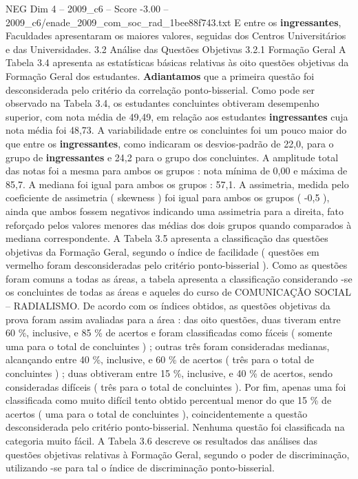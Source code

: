 \begin{textsample}{NEG Dim 4 – 2009\_c6 – Score -3.00 – 2009\_c6/enade\_2009\_com\_soc\_rad\_1bee88f743.txt}
E entre os \textbf{ingressantes}, Faculdades apresentaram os maiores valores, seguidas dos Centros Universitários e das Universidades. 3.2 Análise das Questões Objetivas 3.2.1 Formação Geral A Tabela 3.4 apresenta as estatísticas básicas relativas às oito questões objetivas da Formação Geral dos estudantes. \textbf{Adiantamos} que a primeira questão foi desconsiderada pelo critério da correlação ponto-bisserial.
Como pode ser observado na Tabela 3.4, os estudantes concluintes obtiveram desempenho superior, com nota média de 49,49, em relação aos estudantes \textbf{ingressantes} cuja nota média foi 48,73.
A variabilidade entre os concluintes foi um pouco maior do que entre os \textbf{ingressantes}, como indicaram os desvios-padrão de 22,0, para o grupo de \textbf{ingressantes} e 24,2 para o grupo dos concluintes.
A amplitude total das notas foi a mesma para ambos os grupos : nota mínima de 0,00 e máxima de 85,7.
A mediana foi igual para ambos os grupos : 57,1.
A assimetria, medida pelo coeficiente de assimetria ( skewness ) foi igual para ambos os grupos ( -0,5 ), ainda que ambos fossem negativos indicando uma assimetria para a direita, fato reforçado pelos valores menores das médias dos dois grupos quando comparados à mediana correspondente.
A Tabela 3.5 apresenta a classificação das questões objetivas da Formação Geral, segundo o índice de facilidade ( questões em vermelho foram desconsideradas pelo critério ponto-bisserial ).
Como as questões foram comuns a todas as áreas, a tabela apresenta a classificação considerando -se os concluintes de todas as áreas e aqueles do curso de COMUNICAÇÃO SOCIAL – RADIALISMO.
De acordo com os índices obtidos, as questões objetivas da prova foram assim avaliadas para a área : das oito questões, duas tiveram entre 60 \%, inclusive, e 85 \% de acertos e foram classificadas como fáceis ( somente uma para o total de concluintes ) ; outras três foram consideradas medianas, alcançando entre 40 \%, inclusive, e 60 \% de acertos ( três para o total de concluintes ) ; duas obtiveram entre 15 \%, inclusive, e 40 \% de acertos, sendo consideradas difíceis ( três para o total de concluintes ).
Por fim, apenas uma foi classificada como muito difícil tento obtido percentual menor do que 15 \% de acertos ( uma para o total de concluintes ), coincidentemente a questão desconsiderada pelo critério ponto-bisserial.
Nenhuma questão foi classificada na categoria muito fácil.
A Tabela 3.6 descreve os resultados das análises das questões objetivas relativas à Formação Geral, segundo o poder de discriminação, utilizando -se para tal o índice de discriminação ponto-bisserial.

\end{textsample}
